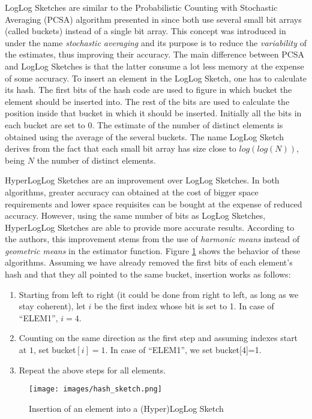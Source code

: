 LogLog Sketches \cite{Durand:2003tc} are similar to the Probabilistic
Counting with Stochastic Averaging (PCSA) algorithm presented in
\cite{Flajolet:1985wd} since both use several small bit arrays (called
buckets) instead of a single bit array. This concept was introduced in
\cite{Flajolet:1985wd} under the name \emph{stochastic averaging} and
its purpose is to reduce the \emph{variability} of the estimates, thus
improving their accuracy. The main difference between PCSA and LogLog
Sketches is that the latter consume a lot less memory at the expense
of some accuracy. To insert an element in the LogLog Sketch, one has
to calculate its hash. The first bits of the hash code are used to
figure in which bucket the element should be inserted into. The rest
of the bits are used to calculate the position inside that bucket in
which it should be inserted. Initially all the bits in each bucket are
set to $0$. The estimate of the number of distinct
elements is obtained using the average of the several buckets. The
name LogLog Sketch derives from the fact that each small bit array has
size close to $log(log(N))$, being $N$ the number of distinct
elements.

HyperLogLog Sketches \cite{Fusy:2007um} are an improvement over LogLog
Sketches. In both algorithms, greater accuracy can obtained at the cost
of bigger space requirements and lower space requisites can be bought
at the expense of reduced accuracy. However, using the
same number of bits as LogLog Sketches, HyperLogLog Sketches are able
to provide more accurate results. According to the authors, this
improvement stems from the use of \emph{harmonic means} instead of
\emph{geometric means} in the estimator function. Figure
\ref{fig:hyperloglog_sketches} shows the behavior of these algorithms.
Assuming we have already removed the first bits of each element's hash
and that they all pointed to the same bucket, insertion works as
follows:
\begin{enumerate}
\item Starting from left to right (it could be done from right to
  left, as long as we stay coherent), let $i$ be the first
  index whose bit is set to 1. In case of ``ELEM1'', $i=4$.
\item Counting on the same direction as the first step and
  assuming indexes start at $1$, set bucket$[i]=1$. In case of
  ``ELEM1'', we set bucket[4]=1.
\item Repeat the above steps for all elements.
\end{enumerate}
\begin{figure}[htb]
  \centering
  \texttt{[image: images/hash\_sketch.png]}
  \caption{Insertion of an element into a (Hyper)LogLog Sketch}
  \label{fig:hyperloglog_sketches}
\end{figure}

